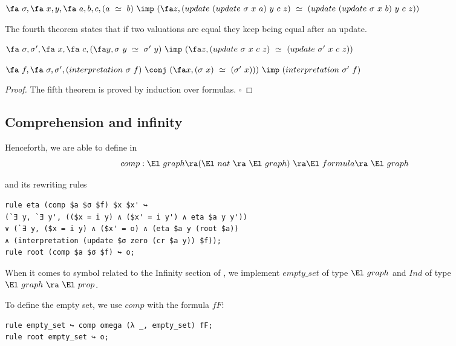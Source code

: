 \documentclass[a4paper]{article}
\begin{document}
\begin{theorem}
$\fa \ \sigma, \fa \ x, y, \fa \ a, b, c, (a \ \simeq \ b) \ \imp \ (\fa z, (update \ (update \ \sigma \ x \ a) \ y \ c \ z) \ \simeq \ (update \  (update \ \sigma \ x \ b) \ y \ c \ z))$
\end{theorem}

The fourth theorem states that if two valuations are equal they keep being equal after an update.

\begin{theorem}
$\fa \ \sigma, \sigma', \fa \ x, \fa \ c, (\fa y, \sigma \ y \ \simeq \ \sigma' \ y) \ \imp \ (\fa z, (update \ \sigma \ x \ c \ z) \ \simeq \ (update \ \sigma' \ x \ c \ z))$
\end{theorem}

\begin{theorem}
$\fa \ f, \fa \ \sigma, \sigma', (interpretation \ \sigma \ f) \ \conj \ (\fa x, (\sigma \ x) \ \simeq \ (\sigma' \ x))) \ \imp \ (interpretation \ \sigma' \ f)$
\end{theorem}

\begin{proof}
The fifth theorem is proved by induction over formulas. $\square$
\end{proof}

\subsection{Comprehension and infinity}

Henceforth, we are able to define in \dedukti
$$comp : \El~graph \ra (\El \ nat \ \ra \ \El~graph) \  \ra \El \ formula \ra \ \El~graph$$

and its rewriting rules

\begin{lstlisting}
rule eta (comp $a $σ $f) $x $x' ↪ 
(`∃ y, `∃ y', (($x = i y) ∧ ($x' = i y') ∧ eta $a y y')) 
∨ (`∃ y, ($x = i y) ∧ ($x' = o) ∧ (eta $a y (root $a))
∧ (interpretation (update $σ zero (cr $a y)) $f));
rule root (comp $a $σ $f) ↪ o;
\end{lstlisting}

When it comes to symbol related to the Infinity section of \cite{zermodulo}, we implement $empty\_set$ of type $\El~graph$ and $Ind$ of type $\El~graph \ \ra \ \El~prop$.

To define the empty set, we use $comp$ with the formula $fF$:
\begin{lstlisting}
rule empty_set ↪ comp omega (λ _, empty_set) fF;
rule root empty_set ↪ o;
\end{lstlisting}
\end{document}
